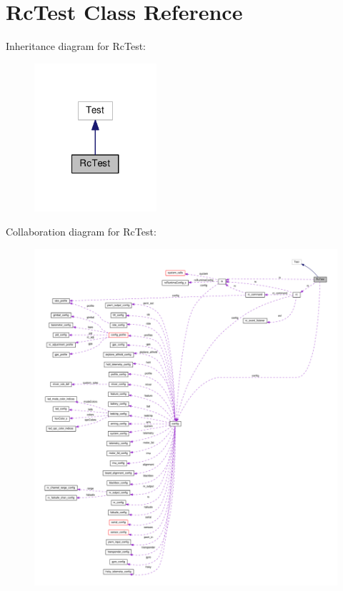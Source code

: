 \hypertarget{classRcTest}{\section{Rc\+Test Class Reference}
\label{classRcTest}
}


Inheritance diagram for Rc\+Test\+:\nopagebreak
\begin{figure}[H]
\begin{center}
\leavevmode
\includegraphics[width=128pt]{classRcTest__inherit__graph}
\end{center}
\end{figure}


Collaboration diagram for Rc\+Test\+:\nopagebreak
\begin{figure}[H]
\begin{center}
\leavevmode
\includegraphics[width=350pt]{classRcTest__coll__graph}
\end{center}
\end{figure}
